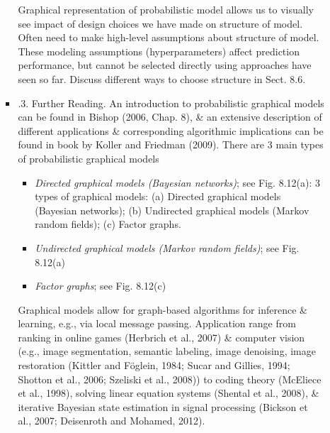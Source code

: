 \documentclass{article}
\begin{document}
\begin{itemize}
\begin{itemize}
\begin{itemize}
			Graphical representation of probabilistic model allows us to visually see impact of design choices we have made on structure of model. Often need to make high-level assumptions about structure of model. These modeling assumptions (hyperparameters) affect prediction performance, but cannot be selected directly using approaches have seen so far. Discuss different ways to choose structure in Sect. 8.6.
			\item {.3. Further Reading.} An introduction to probabilistic graphical models can be found in Bishop (2006, Chap. 8), \& an extensive description of different applications \& corresponding algorithmic implications can be found in book by Koller and Friedman (2009). There are 3 main types of probabilistic graphical models
			\begin{itemize}
				\item {\it Directed graphical models (Bayesian networks)}; see {\sf Fig. 8.12(a): 3 types of graphical models: (a) Directed graphical models (Bayesian networks); (b) Undirected graphical models (Markov random fields); (c) Factor graphs.}
				\item {\it Undirected graphical models (Markov random fields)}; see Fig. 8.12(a)
				\item {\it Factor graphs}; see Fig. 8.12(c)
			\end{itemize}
			Graphical models allow for graph-based algorithms for inference \& learning, e.g., via local message passing. Application range from ranking in online games (Herbrich et al., 2007) \& computer vision (e.g., image segmentation, semantic labeling, image denoising, image restoration (Kittler and Föglein, 1984; Sucar and Gillies, 1994; Shotton et al., 2006; Szeliski et al., 2008)) to coding theory (McEliece et al., 1998), solving linear equation systems (Shental et al., 2008), \& iterative Bayesian state estimation in signal processing (Bickson et al., 2007; Deisenroth and Mohamed, 2012).
			

\end{itemize}
\end{itemize}
\end{itemize}
\end{document}
